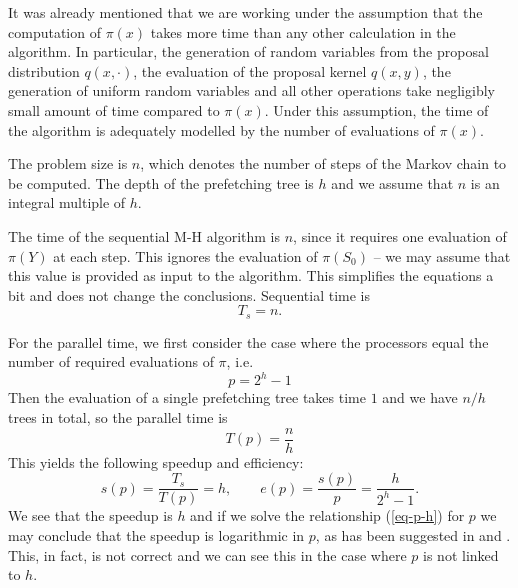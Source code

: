 \documentclass[11pt,letterpaper]{article}       %
\begin{document}
It was already mentioned that we are working under the assumption that the
computation of $\pi(x)$ takes more time than any other calculation in the
algorithm.  In particular, the generation of random variables from the proposal
distribution $q(x,\cdot)$, the evaluation of the proposal kernel $q(x,y)$, the
generation of uniform random variables and all other operations take negligibly
small amount of time compared to $\pi(x)$.  Under this assumption, the time of
the algorithm is adequately modelled by the number of evaluations of $\pi(x)$.

The problem size is $n$, which denotes the number of steps of the Markov 
chain to be computed.  The depth of the prefetching tree is $h$ and we
assume that $n$ is an integral multiple of $h$.

The time of the sequential M-H algorithm is $n$, since it requires one
evaluation of $\pi(Y)$ at each step.  This ignores the evaluation of $\pi(S_0)$
-- we may assume that this value is provided as input to the algorithm.  This
simplifies the equations a bit and does not change the conclusions. Sequential time is
\begin{equation}
T_s = n.
\end{equation}

For the parallel time, we first consider the case where the processors equal
the number of required evaluations of $\pi$, i.e. 
\begin{equation}
p=2^h-1
\label{eq-p-h}
\end{equation}
Then the evaluation of a single prefetching tree takes time $1$ and we have $n/h$ trees in total, so
the parallel time is
\begin{equation}
T(p) = \frac{n}{h}
\end{equation}
This yields the following speedup and efficiency:
\begin{equation}
s(p) = \frac{T_s}{T(p)} = h,  \qquad e(p) = \frac{s(p)}{p} = \frac{h}{2^h-1}.
\end{equation}
We see that the speedup is $h$ and if we solve the relationship (\ref{eq-p-h})
for $p$ we may conclude that the speedup is logarithmic in $p$, as has been
suggested in  \cite{brockwell2006parallel} and \cite{strid2010efficient}.  This, in fact,
is not correct and we can see this in the case where $p$ is not linked to $h$.  
\end{document}
